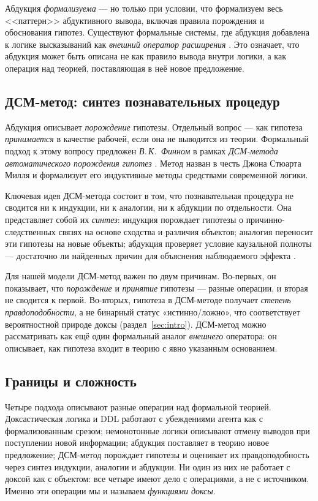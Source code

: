 \documentclass[12pt,a4paper]{article}
\begin{document}
Абдукция \emph{формализуема} --- но только при условии, что формализуем весь
<<паттерн>> абдуктивного вывода, включая правила порождения и обоснования гипотез.
Существуют формальные системы, где абдукция добавлена к логике высказываний как
\emph{внешний оператор расширения} \cite{kakas}. Это означает, что абдукция может быть
описана не как правило вывода внутри логики, а как операция над теорией,
поставляющая в неё новое предложение.

\subsection{ДСМ-метод: синтез познавательных процедур}
\label{sec:dsm}

Абдукция описывает \emph{порождение} гипотезы. Отдельный вопрос --- как гипотеза \emph{принимается} в
качестве рабочей, если она не выводится из теории. Формальный подход к этому вопросу предложен
\emph{В.\,К.~Финном} в рамках \emph{ДСМ-метода автоматического порождения гипотез} \cite{finn_dsm}.
Метод назван в честь Джона Стюарта Милля и формализует его индуктивные методы средствами современной логики.

Ключевая идея ДСМ-метода состоит в том, что познавательная процедура не сводится ни к индукции, ни к
аналогии, ни к абдукции по отдельности. Она представляет собой их \emph{синтез}: индукция порождает
гипотезы о причинно-следственных связях на основе сходства и различия объектов; аналогия переносит эти
гипотезы на новые объекты; абдукция проверяет условие каузальной полноты --- достаточно ли найденных
причин для объяснения наблюдаемого эффекта \cite{finn_voprosy, finn_epistemology}.

Для нашей модели ДСМ-метод важен по двум причинам. Во-первых, он показывает, что \emph{порождение} и
\emph{принятие} гипотезы --- разные операции, и вторая не сводится к первой. Во-вторых, гипотеза
в ДСМ-методе получает \emph{степень правдоподобности}, а не бинарный статус «истинно/ложно», что
соответствует вероятностной природе доксы (раздел~\ref{sec:intro}). ДСМ-метод можно рассматривать как ещё один
формальный аналог \emph{внешнего} оператора: он описывает, как гипотеза входит в теорию с явно
указанным основанием.

\subsection{Границы и сложность}
\label{sec:limits_theory}

Четыре подхода описывают разные операции над формальной теорией. Доксастическая
логика и DDL работают с убеждениями агента как с формализованным срезом;
немонотонные логики описывают отмену выводов при поступлении новой информации;
абдукция поставляет в теорию новое предложение; ДСМ-метод порождает гипотезы
и оценивает их правдоподобность через синтез индукции, аналогии и абдукции.
Ни один из них не работает с доксой как с объектом: все четыре имеют дело с
операциями, а не с источником. Именно эти операции мы и называем \emph{функциями
доксы}.
\end{document}
